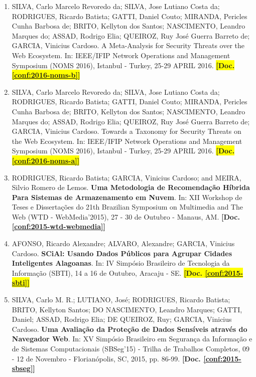 \documentclass[a4paper,oneside,10pt]{article}
\begin{document}
\begin{enumerate}
\renewcommand{\labelenumi}{{\large\bfseries\arabic{enumi}.}}

\item SILVA, Carlo Marcelo Revoredo da; SILVA, Jose Lutiano Costa da; RODRIGUES, Ricardo Batista; GATTI, Daniel Couto; MIRANDA, Pericles Cunha Barbosa de; BRITO, Kellyton dos Santos; NASCIMENTO, Leandro Marques do; ASSAD, Rodrigo Elia; QUEIROZ, Ruy José Guerra Barreto de; GARCIA, Vinicius Cardoso. A Meta-Analysis for Security Threats over the Web Ecosystem. In: IEEE/IFIP Network Operations and Management Symposium (NOMS 2016), Istanbul - Turkey, 25-29 APRIL 2016. \colorbox{yellow}{\textbf{[Doc. \ref{conf:2016-noms-b}]}}

\item SILVA, Carlo Marcelo Revoredo da; SILVA, Jose Lutiano Costa da; RODRIGUES, Ricardo Batista; GATTI, Daniel Couto; MIRANDA, Pericles Cunha Barbosa de; BRITO, Kellyton dos Santos; NASCIMENTO, Leandro Marques do; ASSAD, Rodrigo Elia; QUEIROZ, Ruy José Guerra Barreto de; GARCIA, Vinicius Cardoso. Towards a Taxonomy for Security Threats on the Web Ecosystem. In: IEEE/IFIP Network Operations and Management Symposium (NOMS 2016), Istanbul - Turkey, 25-29 APRIL 2016. \colorbox{yellow}{\textbf{[Doc. \ref{conf:2016-noms-a}]}}

\item RODRIGUES, Ricardo Batista; GARCIA, Vinicius Cardoso; and MEIRA, Silvio Romero de Lemos. \textbf{Uma Metodologia de Recomendação Híbrida Para Sistemas de Armazenamento em Nuvem}. In: XII Workshop de Teses e Dissertações do 21th Brazilian Symposium on Multimedia and The Web (WTD - WebMedia'2015), 27 - 30 de Outubro - Manaus, AM. {\textbf{[Doc. \ref{conf:2015-wtd-webmedia}]}}

\item AFONSO, Ricardo Alexandre; ALVARO, Alexandre; GARCIA, Vinicius Cardoso. \textbf{SCiAl: Usando Dados Públicos para Agrupar Cidades Inteligentes Alagoanas}. In: IV Simpósio Brasileiro de Tecnologia da Informação (SBTI), 14 a 16 de Outubro, Aracaju - SE. \colorbox{yellow}{\textbf{[Doc. \ref{conf:2015-sbti}]}}

\item SILVA, Carlo M. R.; LUTIANO, José; RODRIGUES, Ricardo Batista; BRITO, Kellyton Santos; DO NASCIMENTO, Leandro Marques; GATTI, Daniel; ASSAD, Rodrigo Elia; DE QUEIROZ, Ruy; GARCIA, Vinicius Cardoso. \textbf{Uma Avaliação da Proteção de Dados Sensíveis através do Navegador Web}. In: XV Simpósio Brasileiro em Segurança da Informação e de Sistemas Computacionais (SBSeg'15) - Trilha de Trabalhos Completos, 09 - 12 de Novembro - Florianópolis, SC, 2015, pp. 86-99. \textbf{[Doc. \ref{conf:2015-sbseg}]}


\end{enumerate}
\end{document}
